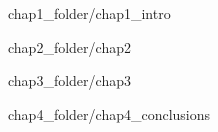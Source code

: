 \documentclass[a4paper,12pt,titlepage, onecolumn, twoside]{report}
\numberwithin{equation}{chapter}
\numberwithin{table}{chapter}
\numberwithin{figure}{chapter}
\begin{document}
\pagestyle {fancy}


\doublespacing


 {chap1_folder/chap1_intro}

 {chap2_folder/chap2}

 {chap3_folder/chap3}

 {chap4_folder/chap4_conclusions}

\newpage
\end{document}
